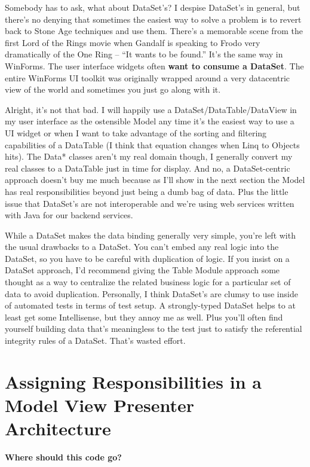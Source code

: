 \documentclass{article}
\begin{document}
{Somebody has to ask, what about DataSet's?  I despise DataSet's in general, but there's no denying that sometimes the easiest way to solve a problem is to revert back to Stone Age techniques and use them.  There's a memorable scene from the first Lord of the Rings movie when Gandalf is speaking to Frodo very dramatically of the One Ring – “It wants to be found.”  It's the same way in WinForms.  The user interface widgets often \textbf{want to consume a DataSet}.  The entire WinForms UI toolkit was originally wrapped around a very datacentric view of the world and sometimes you just go along with it. 

Alright, it's not that bad.  I will happily use a DataSet/DataTable/DataView in my user interface as the ostensible Model any time it's the easiest way to use a UI widget or when I want to take advantage of the sorting and filtering capabilities of a DataTable (I think that equation changes when Linq to Objects hits).  The Data* classes aren't my real domain though, I generally convert my real classes to a DataTable just in time for display.  And no, a DataSet-centric approach doesn't buy me much because as I'll show in the next section the Model has real responsibilities beyond just being a dumb bag of data.  Plus the little issue that DataSet's are not interoperable and we're using web services written with Java for our backend services. 

While a DataSet makes the data binding generally very simple, you're left with the usual drawbacks to a DataSet.  You can't embed any real logic into the DataSet, so you have to be careful with duplication of logic.  If you insist on a DataSet approach, I'd recommend giving the Table Module approach some thought as a way to centralize the related business logic for a particular set of data to avoid duplication.  Personally, I think DataSet's are clumsy to use inside of automated tests in terms of test setup.  A strongly-typed DataSet helps to at least get some Intellisense, but they annoy me as well.  Plus you'll often find yourself building data that's meaningless to the test just to satisfy the referential integrity rules of a DataSet.  That's wasted effort.

\section{ Assigning Responsibilities in a Model View Presenter Architecture } 

\Large {\textbf{Where should this code go?}}

}
\end{document}
